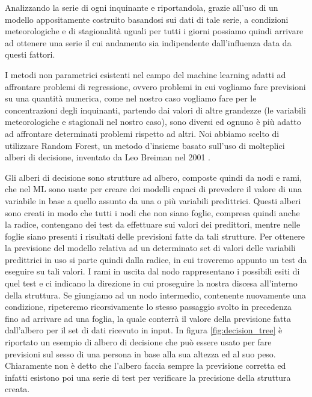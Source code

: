 Analizzando la serie di ogni inquinante e riportandola, grazie all'uso di un modello appositamente costruito basandosi sui dati di tale serie, a condizioni meteorologiche e di stagionalità uguali per tutti i giorni possiamo quindi arrivare ad ottenere una serie il cui andamento sia indipendente dall'influenza data da questi fattori.

I metodi non parametrici esistenti nel campo del machine learning adatti ad affrontare problemi di regressione, ovvero problemi in cui vogliamo fare previsioni su una quantità numerica, come nel nostro caso vogliamo fare per le concentrazioni degli inquinanti, partendo dai valori di altre grandezze (le variabili meteorologiche e stagionali nel nostro caso), sono diversi ed ognuno è più adatto ad affrontare determinati problemi rispetto ad altri. Noi abbiamo scelto di utilizzare Random Forest, un metodo d'insieme basato sull'uso di molteplici alberi di decisione, inventato da Leo Breiman nel 2001 \cite{breiman2001random}.

Gli alberi di decisione sono strutture ad albero, composte quindi da nodi e rami, che nel ML sono usate per creare dei modelli capaci di prevedere il valore di una variabile in base a quello assunto da una o più variabili predittrici. Questi alberi sono creati in modo che tutti i nodi che non siano foglie, compresa quindi anche la radice, contengano dei test da effettuare sui valori dei predittori, mentre nelle foglie siano presenti i risultati delle previsioni fatte da tali strutture. Per ottenere la previsione del modello relativa ad un determinato set di valori delle variabili predittrici in uso si parte quindi dalla radice, in cui troveremo appunto un test da eseguire su tali valori. I rami in uscita dal nodo rappresentano i possibili esiti di quel test e ci indicano la direzione in cui proseguire la nostra discesa all'interno della struttura. Se giungiamo ad un nodo intermedio, contenente nuovamente una condizione, ripeteremo ricorsivamente lo stesso passaggio svolto in precedenza fino ad arrivare ad una foglia, la quale conterrà il valore della previsione fatta dall'albero per il set di dati ricevuto in input.
In figura \ref{fig:decision_tree} è riportato un esempio di albero di decisione che può essere usato per fare previsioni sul sesso di una persona in base alla sua altezza ed al suo peso. Chiaramente non è detto che l'albero faccia sempre la previsione corretta ed infatti esistono poi una serie di test per verificare la precisione della struttura creata.

